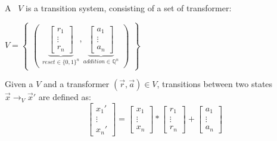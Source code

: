 \documentclass[%
10pt,
dvipsnames,
]{beamer}
\begin{document}
\begin{frame}[t]
	\frametitle{\qvasr}
	\begin{definition}
			A \qvasr\ $V$ is a transition system, consisting of a set of transformer: \\
			\begin{center}
			 $ V = 
			\begin{Bmatrix}
				\begin{pmatrix}
					\underbrace{
					\begin{bmatrix}
						r_1 \\
						\vdots \\
						r_n
					\end{bmatrix}}_{reset \in \{0,1\}^n},
					\underbrace{
					\begin{bmatrix}
						a_1 \\
						\vdots \\
						a_n
					\end{bmatrix}}_{addition \in \mathbb{Q}^n}
				\end{pmatrix}
			\end{Bmatrix}
		$
		\end{center}
	\end{definition}
	\begin{definition}
	Given a \qvasr $V$ and a transformer $(\vec{r}, \vec{a}) \in V$, transitions between two states $\vec{x} \rightarrow_V \vec{x}'$ are defined as: \\
	\begin{equation*}
			\begin{bmatrix}
				x_1' \\
				\vdots \\
				x_n'
			\end{bmatrix}
		=
			\begin{bmatrix}
				x_1 \\
				\vdots \\
				x_n
			\end{bmatrix}
		*
			\begin{bmatrix}
			r_1 \\
			\vdots \\
			r_n
			\end{bmatrix}
		+
			\begin{bmatrix}
			a_1 \\
			\vdots \\
			a_n
		\end{bmatrix}		
	\end{equation*}
	\end{definition}
\end{frame}
\end{document}
